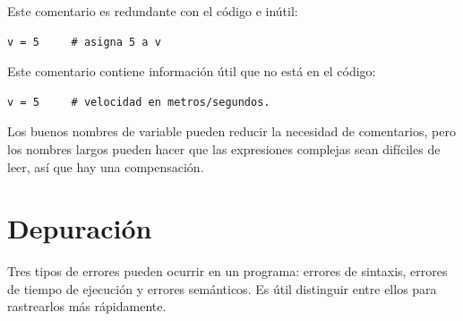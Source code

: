 \documentclass[10pt]{book}
\begin{document}
Este comentario es redundante con el código e inútil:

\begin{verbatim}
v = 5     # asigna 5 a v
\end{verbatim}
%
Este comentario contiene información útil que no está en el código:

\begin{verbatim}
v = 5     # velocidad en metros/segundos.
\end{verbatim}
%
Los buenos nombres de variable pueden reducir la necesidad de comentarios, pero
los nombres largos pueden hacer que las expresiones complejas sean difíciles de leer,
así que hay una compensación.


\section{Depuración}

Tres tipos de errores pueden ocurrir en un programa: errores de sintaxis, errores
de tiempo de ejecución y errores semánticos.  Es útil
distinguir entre ellos para rastrearlos más rápidamente.
\end{document}
